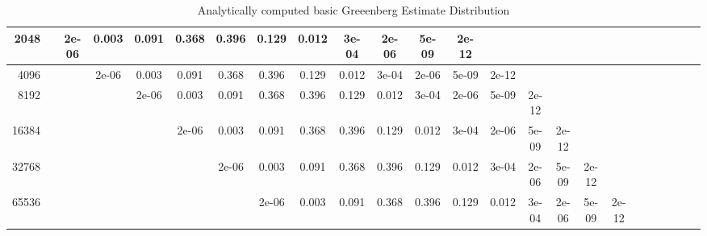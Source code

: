 \begin{appendices}
\begin{sidewaystable}
{\begin{tabular}{r|ccccccccccccccccccccccc}
2048 &&2e-06 &0.003 &0.091 &0.368 &0.396 &0.129 &0.012 &3e-04 &2e-06 &5e-09 &2e-12 &&&&&\\\hline

4096 &&&2e-06 &0.003 &0.091 &0.368 &0.396 &0.129 &0.012 &3e-04 &2e-06 &5e-09 &2e-12 &&&&\\\hline

8192 &&&&2e-06 &0.003 &0.091 &0.368 &0.396 &0.129 &0.012 &3e-04 &2e-06 &5e-09 &2e-12 &&&\\\hline

16384 &&&&&2e-06 &0.003 &0.091 &0.368 &0.396 &0.129 &0.012 &3e-04 &2e-06 &5e-09 &2e-12 &&\\\hline

32768 &&&&&&2e-06 &0.003 &0.091 &0.368 &0.396 &0.129 &0.012 &3e-04 &2e-06 &5e-09 &2e-12 &\\\hline

65536 &&&&&&&2e-06 &0.003 &0.091 &0.368 &0.396 &0.129 &0.012 &3e-04 &2e-06 &5e-09 &2e-12\\

\bottomrule
\end{tabular}
}
\caption{Analytically computed basic Greeenberg Estimate Distribution}
\label{basic-greenberg-stop-probabilities}

\end{sidewaystable}

\end{appendices}
